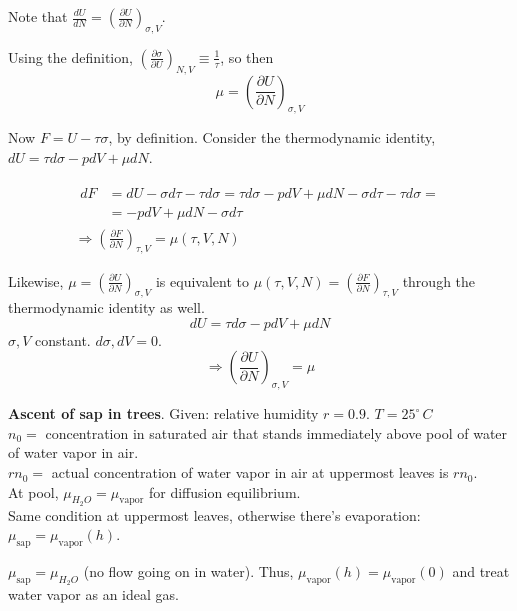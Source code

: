 \documentclass[twoside]{amsart}
\theoremstyle{plain}
\theoremstyle{definition}
\newcommand{\solutionhead}[1]
  {
   \noindent{\small\bf Solution #1.}
   }
\begin{document}
Note that $\frac{ dU}{ dN} = \left( \frac{ \partial U}{ \partial N} \right)_{\sigma, V}$.  

Using the definition, $\left( \frac{ \partial \sigma}{ \partial U} \right)_{N,V} \equiv \frac{1}{\tau}$, so then
\[
\boxed{ \mu = \left( \frac{ \partial U}{ \partial N} \right)_{\sigma, V}}
\]

Now $F = U - \tau \sigma$, by definition.  Consider the thermodynamic identity, $dU = \tau d\sigma - p dV + \mu dN$.  

\[
\begin{gathered}
\begin{aligned}
  dF & = dU - \sigma d\tau - \tau d\sigma = \tau d\sigma - pdV + \mu dN - \sigma d\tau - \tau d\sigma = \\
  & = - pdV + \mu dN - \sigma d\tau
\end{aligned} \\
\Longrightarrow \left( \frac{ \partial F}{ \partial N} \right)_{ \tau, V} = \mu(\tau, V, N)
\end{gathered}
\]

Likewise, $\mu = \left( \frac{   \partial U}{ \partial N} \right)_{\sigma, V}$ is equivalent to $\mu(\tau, V, N) = \left( \frac{ \partial F}{ \partial N} \right)_{\tau, V}$ through the thermodynamic identity as well.  
\[
dU = \tau d\sigma - p dV + \mu dN
\]
$\sigma, V$ constant.  $d\sigma, dV = 0$.  
\[
\Longrightarrow \left( \frac{ \partial U}{\partial N} \right)_{\sigma, V} = \mu 
\]

\solutionhead{12} \textbf{Ascent of sap in trees}.  Given: relative humidity $r = 0.9$.  $T = 25^{\circ} \, C$ \\

$n_0 = $ concentration in saturated air that stands immediately above pool of water of water vapor in air.  \\
$r n_0 = $ actual concentration of water vapor in air at uppermost leaves is $rn_0$.   \\

At pool, $\mu_{H_2O} = \mu_{\text{vapor}}$ for diffusion equilibrium.   \\

Same condition at uppermost leaves, otherwise there's evaporation: \\
$\mu_{\text{sap}} = \mu_{\text{vapor}}(h)$.  

$\mu_{\text{sap}} = \mu_{H_2O}$ (no flow going on in water).  Thus, $\mu_{\text{vapor}}(h) = \mu_{\text{vapor}}(0)$ and treat water vapor as an ideal gas.  
\end{document}
